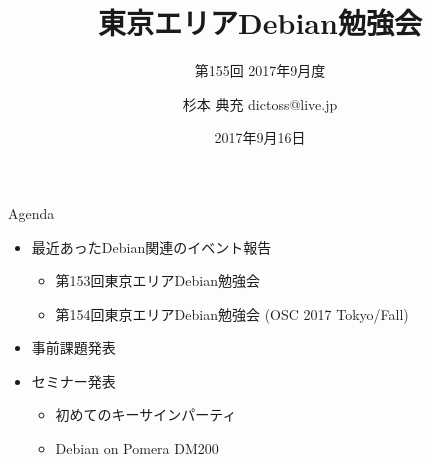 \title{東京エリアDebian勉強会}
\subtitle{第155回 2017年9月度}
\author{杉本 典充  dictoss@live.jp}
\date{2017年9月16日}



\begin{frame}
\titlepage{}
\end{frame}

\begin{frame}{Agenda}
 \begin{minipage}[t]{0.45\hsize}
  \begin{itemize}
  \item 最近あったDebian関連のイベント報告
    \begin{itemize}
    \item 第153回東京エリアDebian勉強会
    \item 第154回東京エリアDebian勉強会 (OSC 2017 Tokyo/Fall)
    \end{itemize}
  \item 事前課題発表
  \end{itemize}
 \end{minipage}
 \begin{minipage}[t]{0.45\hsize}
  \begin{itemize}
  \item セミナー発表
    \begin{itemize}
    \item 初めてのキーサインパーティ
    \item Debian on Pomera DM200
    \end{itemize}
  \end{itemize}
 \end{minipage}
\end{frame}

